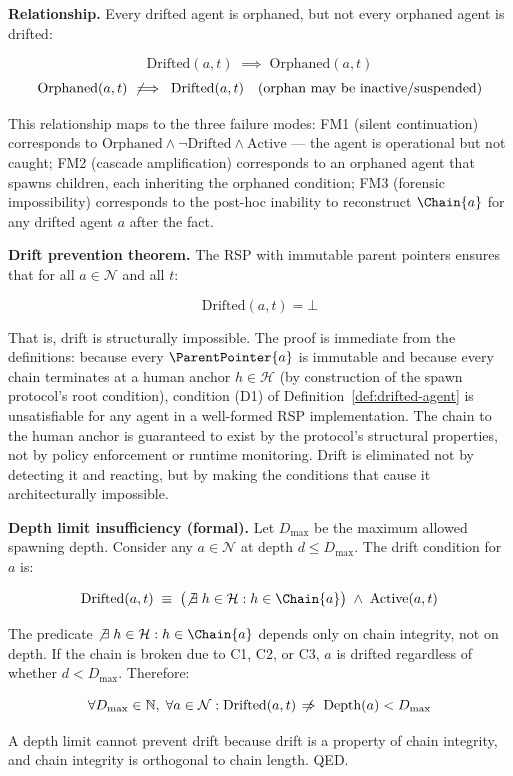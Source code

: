 \bigskip
\noindent\textbf{Relationship.} Every drifted agent is orphaned, but not every orphaned agent is drifted:

\[
\text{Drifted}(a, t) \;\implies\; \text{Orphaned}(a, t)
\]
\[
\text{Orphaned}(a, t) \;\not\!\implies\; \text{Drifted}(a, t) \quad \text{(orphan may be inactive/suspended)}
\]

This relationship maps to the three failure modes: FM1 (silent continuation) corresponds to $\text{Orphaned} \land \neg\text{Drifted} \land \text{Active}$ — the agent is operational but not caught; FM2 (cascade amplification) corresponds to an orphaned agent that spawns children, each inheriting the orphaned condition; FM3 (forensic impossibility) corresponds to the post-hoc inability to reconstruct $\Chain{a}$ for any drifted agent $a$ after the fact.

\bigskip
\noindent\textbf{Drift prevention theorem.} The RSP with immutable parent pointers ensures that for all $a \in \mathcal{N}$ and all $t$:

\[
\text{Drifted}(a, t) = \bot
\]

That is, drift is structurally impossible. The proof is immediate from the definitions: because every $\ParentPointer{a}$ is immutable and because every chain terminates at a human anchor $h \in \mathcal{H}$ (by construction of the spawn protocol's root condition), condition (D1) of Definition~\ref{def:drifted-agent} is unsatisfiable for any agent in a well-formed RSP implementation. The chain to the human anchor is guaranteed to exist by the protocol's structural properties, not by policy enforcement or runtime monitoring. Drift is eliminated not by detecting it and reacting, but by making the conditions that cause it architecturally impossible.

\bigskip
\noindent\textbf{Depth limit insufficiency (formal).} Let $D_{\max}$ be the maximum allowed spawning depth. Consider any $a \in \mathcal{N}$ at depth $d \leq D_{\max}$. The drift condition for $a$ is:

\[
\text{Drifted}(a, t) \;\equiv\; \bigl( \not\exists\; h \in \mathcal{H} : h \in \Chain{a} \bigr) \;\land\; \text{Active}(a, t)
\]

The predicate $\not\exists\; h \in \mathcal{H} : h \in \Chain{a}$ depends only on chain integrity, not on depth. If the chain is broken due to C1, C2, or C3, $a$ is drifted regardless of whether $d < D_{\max}$. Therefore:

\[
\forall D_{\max} \in \mathbb{N},\; \forall a \in \mathcal{N} : \text{Drifted}(a, t) \;\not\!\Rightarrow\; \text{Depth}(a) < D_{\max}
\]

A depth limit cannot prevent drift because drift is a property of chain integrity, and chain integrity is orthogonal to chain length. QED.